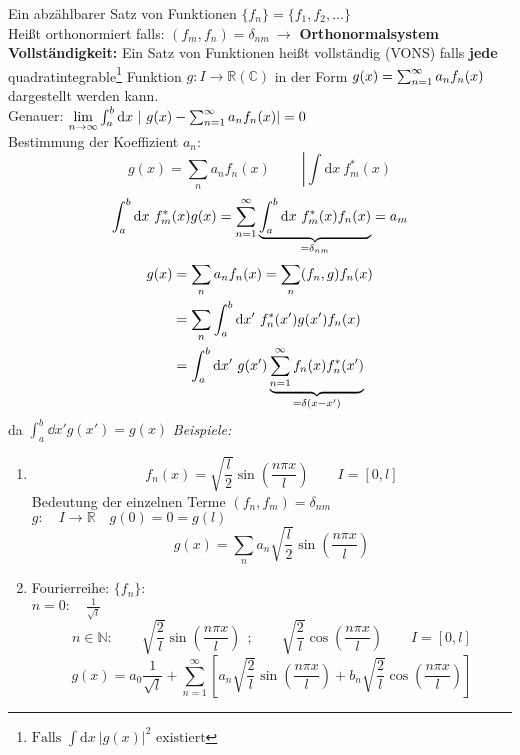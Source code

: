 \noindent
Ein abzählbarer Satz von Funktionen $\{f_n\} = \{f_1, f_2, \dots \}$\\
Heißt orthonormiert falls: $(f_m,f_n) = \delta_{nm}\ \rightarrow$ \textbf{Orthonormalsystem}\\
\textbf{Vollständigkeit:} Ein Satz von Funktionen heißt vollständig (VONS) falls \textbf{jede} quadratintegrable\footnote{$\textrm{Falls }\int \textrm{d}x\ |g(x)|^2 \textrm{ existiert}$} Funktion $g: I \to \mathbb R (\mathbb C)$ in der Form $g(x) = \sum_{n = 1}^{\infty} a_n f_n(x)$ dargestellt werden kann.\\
Genauer: $\lim\limits_{n \to \infty} \int_{a}^{b} \textrm{d}x\ |\ g(x) - \sum_{n = 1}^{\infty} a_n f_n(x)| = 0$\\[5pt]
Bestimmung der Koeffizient $ a_n $:
$$g(x) = \sum_n a_n f_n(x)\ \qquad \left| \int \textrm{d}x\ f_m^*(x) \right.$$
$$\int_{a}^{b}\textrm{d}x\ f_m^* (x) g(x) = \sum_{n = 1}^{\infty} \underbrace{\int_{a}^{b} \textrm{d}x\ f_m^* (x)f_n(x)}_{= \delta_{nm}} = a_m$$
\begin{align*}
 	g(x) &= \sum_n a_n f_n (x) = \sum_n (f_n,g)f_n(x)\\
 	&= \sum_n \int_{a}^{b} \textrm{d}x'\ f_n^* (x') g(x') f_n(x)\\
 	&= \int_{a}^{b} \textrm{d}x'\ g(x') \underbrace{\sum_{n = 1}^{\infty} f_n(x)f_n^*(x')}_{= \delta(x - x')}
\end{align*}
da $ \int_{a}^{b} \dd x' g(x') = g(x) $
\noindent
\emph{Beispiele:}
\begin{enumerate}[1)]
	\item 
	\begin{equation*}
	f_n(x) = \sqrt{\frac{l}{2}} \sin\left(\frac{n \pi x}{l}\right) \qquad I = [0,l] 
	\end{equation*}Bedeutung der einzelnen Terme
	$ (f_n,f_m) = \delta_{nm} $\\
	$ g: \quad I \rightarrow \mathbb{R} \quad g(0) = 0 = g(l) $
	\begin{equation*}
	g(x) = \sum_{n} a_n \sqrt{\frac{l}{2}} \sin \left(\frac{n \pi x}{l}\right)
	\end{equation*}
	\item Fourierreihe: $ \{f_n\} $:\\
	$ n=0: \quad \frac{1}{\sqrt{l}} $
	\begin{equation*}
	n \in \mathbb{N}: \qquad \sqrt{\frac{2}{l}} \sin \left(\frac{n \pi x}{l}\right) \ \ ; \qquad \sqrt{\frac{2}{l}} \cos\left(\frac{n \pi x}{l}\right) \qquad I = [0,l]
	\end{equation*}
	\begin{equation*}
	g(x) = a_0 \frac{1}{\sqrt{l}} + \sum_{n=1}^{\infty} \left[a_n \sqrt{\frac{2}{l}} \sin \left(\frac{n \pi x}{l}\right) + b_n \sqrt{\frac{2}{l}} \cos\left(\frac{n \pi x}{l}\right)\right]
	\end{equation*}
	\vspace{5pt}
\end{enumerate}

